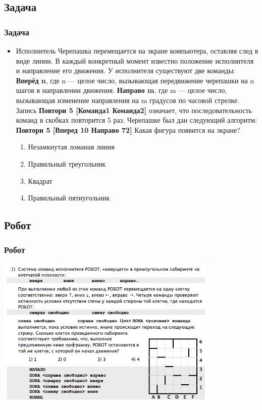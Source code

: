 \documentclass[compress,red]{beamer}
\begin{document}
\subsection{Задача}
\begin{frame}[fragile]
  \frametitle{Задача}
  \begin{itemize}
      \item Исполнитель Черепашка перемещается на экране компьютера, оставляя след в виде линии. В каждый конкретный момент известно положение исполнителя и направление его движения. У исполнителя существуют две команды:
\textbf{Вперёд n}, где n --- целое число, вызывающая передвижение черепашки на n шагов в направлении движения.
\textbf{Направо m}, где m --- целое число, вызывающая изменение направления на m градусов по часовой стрелке.
Запись  \textbf{Повтори 5 [Команда1 Команда2]} означает, что последовательность команд в скобках повторится 5 раз.
Черепашке был дан следующий алгоритм:
\textbf{Повтори 5 [Вперед 10 Направо 72]} Какая фигура появится на экране? 
    \begin{enumerate}
        \item Незамкнутая ломаная линия
        \item Правильный треугольник
        \item Квадрат
        \item Правильный пятиугольник
    \end{enumerate}

  \end{itemize}
\end{frame}

\subsection{Робот}
\begin{frame}[fragile]
  \frametitle{Робот}
  \centerline{\includegraphics[width=0.8\textwidth]{images/robo.png}}
  
\end{frame}
\end{document}
